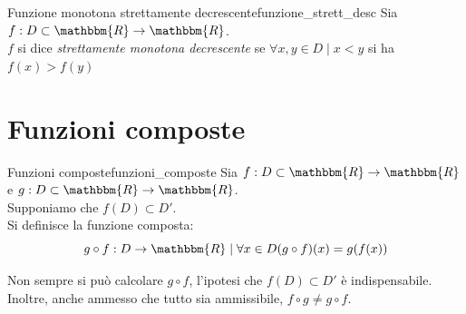 \documentclass[12pt]{report}
\newcounter{definition}
\begin{document}
	\begin{definition}{Funzione monotona strettamente decrescente}{funzione_strett_desc}
		Sia $f: D \subset \mathbbm{R} \to \mathbbm{R}$. \\
		$f$ si dice \textit{strettamente monotona decrescente} se $\forall x, y \in D \mid x < y$ si ha $f(x) > f(y)$
	\end{definition}
	\section{Funzioni composte}
	\begin{definition}{Funzioni composte}{funzioni_composte}
		Sia $f: D \subset \mathbbm{R} \to \mathbbm{R}$ e $g: D \subset \mathbbm{R} \to \mathbbm{R}$.\\
		Supponiamo che $f(D) \subset D'$. \\
		Si definisce la funzione composta: \[g \circ f: D \to \mathbbm{R} \mid \forall x \in D (g \circ f)(x) = g(f(x))\]
	\end{definition}
	Non sempre si può calcolare $g \circ f$, l'ipotesi che $f(D) \subset D'$ è indispensabile. Inoltre, anche ammesso che tutto sia ammissibile, $f \circ g \neq g \circ f$.
\end{document}

